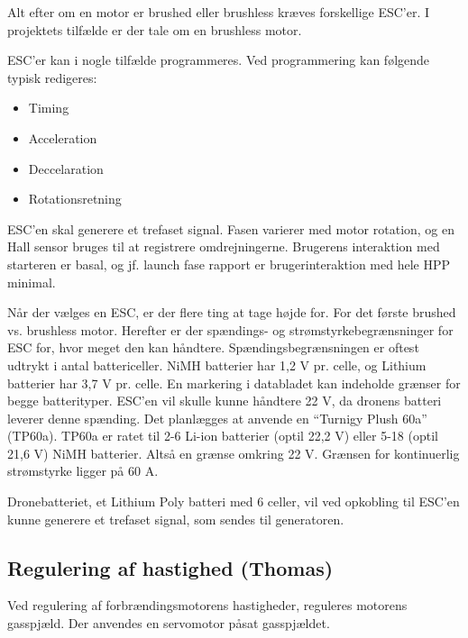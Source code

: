 Alt efter om en motor er brushed eller brushless kræves forskellige ESC'er. I projektets tilfælde er der tale om en brushless motor. 

ESC'er kan i nogle tilfælde programmeres. Ved programmering kan følgende typisk redigeres:
\begin{itemize}
\item Timing
\item Acceleration
\item Deccelaration
\item Rotationsretning
\end{itemize}

ESC'en skal generere et trefaset signal. Fasen varierer med motor rotation, og en Hall sensor bruges til at registrere omdrejningerne. Brugerens interaktion med starteren er basal, og jf. launch fase rapport er brugerinteraktion med hele HPP minimal.

Når der vælges en ESC, er der flere ting at tage højde for. For det første brushed vs. brushless motor. Herefter er der spændings- og strømstyrkebegrænsninger for ESC for, hvor meget den kan håndtere. Spændingsbegrænsningen er oftest udtrykt i antal battericeller. NiMH batterier har 1,2 V pr. celle, og Lithium batterier har 3,7 V pr. celle. En markering i databladet kan indeholde grænser for begge batterityper. ESC'en vil skulle kunne håndtere 22 V, da dronens batteri leverer denne spænding. Det planlægges at anvende  en ``Turnigy Plush 60a'' (TP60a). TP60a er ratet til 2-6 Li-ion batterier (optil 22,2 V) eller 5-18 (optil 21,6 V) NiMH batterier. Altså en grænse omkring 22 V. Grænsen for kontinuerlig strømstyrke ligger på 60 A.

Dronebatteriet, et Lithium Poly batteri med 6 celler, vil ved opkobling til ESC'en kunne generere et trefaset signal, som sendes til generatoren.

\subsection{Regulering af hastighed (Thomas)}
\label{sec:regul-af-hast}

Ved regulering af forbrændingsmotorens hastigheder, reguleres motorens gasspjæld. Der anvendes en servomotor påsat gasspjældet.

